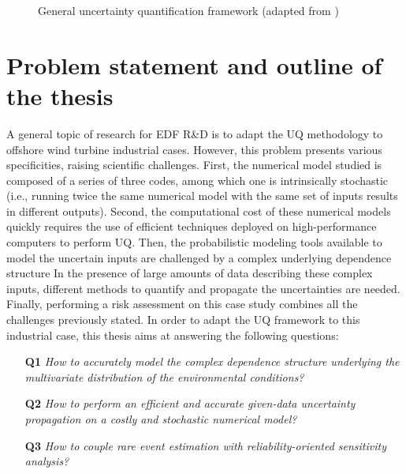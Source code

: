 \begin{figure}[!h]
    \centering
    
    \caption{General uncertainty quantification framework (adapted from \cite{ajenjo_2023}) }
    \label{fig:UQ_methodo}
\end{figure}


\section*{Problem statement and outline of the thesis}
A general topic of research for EDF R\&D is to adapt the UQ methodology to offshore wind turbine industrial cases.  
However, this problem presents various specificities, raising scientific challenges. 
First, the numerical model studied is composed of a series of three codes, among which one is intrinsically stochastic 
(i.e., running twice the same numerical model with the same set of inputs results in different outputs). 
Second, the computational cost of these numerical models quickly requires the use of efficient techniques deployed on high-performance computers to perform UQ.
Then, the probabilistic modeling tools available to model the uncertain inputs are challenged by a complex underlying dependence structure
In the presence of large amounts of data describing these complex inputs, different methods to quantify and propagate the uncertainties are needed.  
Finally, performing a risk assessment on this case study combines all the challenges previously stated. 
In order to adapt the UQ framework to this industrial case, this thesis aims at answering the following questions:
\begin{itemize}
    \item[\textbf{Q1}] \textit{How to accurately model the complex dependence structure underlying the multivariate distribution of the environmental conditions?} 
    \item[\textbf{Q2}] \textit{How to perform an efficient and accurate given-data uncertainty propagation on a costly and stochastic numerical model?}
    \item[\textbf{Q3}] \textit{How to couple rare event estimation with reliability-oriented sensitivity analysis?}
\end{itemize}


